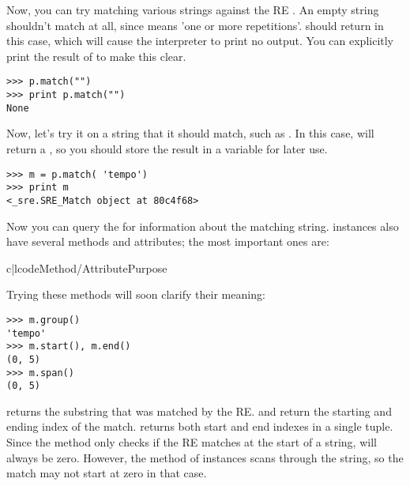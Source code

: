 \documentclass{howto}
\begin{document}
Now, you can try matching various strings against the RE
\regexp{[a-z]+}.  An empty string shouldn't match at all, since
\regexp{+} means 'one or more repetitions'.   should
return  in this case, which will cause the interpreter to
print no output.  You can explicitly print the result of
 to make this clear.

\begin{verbatim}
>>> p.match("")
>>> print p.match("")
None
\end{verbatim}

Now, let's try it on a string that it should match, such as
.  In this case,  will return a
, so you should store the result in a variable for
later use.

\begin{verbatim}
>>> m = p.match( 'tempo')
>>> print m
<_sre.SRE_Match object at 80c4f68>
\end{verbatim}

Now you can query the  for information about the
matching string.    instances also have several
methods and attributes; the most important ones are:

\begin{tableii}{c|l}{code}{Method/Attribute}{Purpose}
\end{tableii}

Trying these methods will soon clarify their meaning:

\begin{verbatim}
>>> m.group()
'tempo'
>>> m.start(), m.end()
(0, 5)
>>> m.span()
(0, 5)
\end{verbatim}

 returns the substring that was matched by the
RE.   and  return the starting and
ending index of the match.  returns both start and end
indexes in a single tuple.  Since the  method only
checks if the RE matches at the start of a string,
 will always be zero.  However, the 
method of  instances scans through the string, so 
the match may not start at zero in that case.
\end{document}
